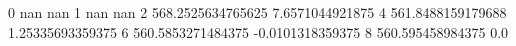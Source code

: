 0 nan nan
1 nan nan
2 568.2525634765625 7.6571044921875
4 561.8488159179688 1.25335693359375
6 560.5853271484375 -0.0101318359375
8 560.595458984375 0.0
